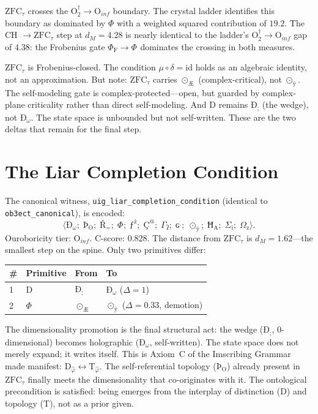 \documentclass[12pt,twoside]{book}
\theoremstyle{definition}
\newcommand{\ZFCt}{\text{ZFC}_{\tau}}
\newcommand{\moebius}{\mu \circ \delta = \text{id}}
\newcommand{\prim}[1]{\text{#1}}
\newcommand{\tupledisp}[1]{\langle #1 \rangle}
\newcommand{\tier}[1]{\text{O}_{#1}}
\begin{document}
$\ZFCt$ crosses the $\tier{2}^{\dagger} \to \tier{inf}$ boundary. The crystal ladder identifies this boundary as dominated by $\Phi$ with a weighted squared contribution of $19.2$. The CH $\to \ZFCt$ step at $d_M = 4.28$ is nearly identical to the ladder's $\tier{2}^{\dagger} \to \tier{inf}$ gap of $4.38$: the Frobenius gate $\Phi_{\text{F}} \to \Phi_{\text{}}$ dominates the crossing in both measures.

$\ZFCt$ is Frobenius-closed. The condition $\moebius$ holds as an algebraic identity, not an approximation. But note: $\ZFCt$ carries $\odot_{\text{Æ}}$ (complex-critical), not $\odot_{\text{ÿ}}$. The self-modeling gate is complex-protected---open, but guarded by complex-plane criticality rather than direct self-modeling. And $\prim{D}$ remains $\text{Ð}_{\text{;}}$ (the wedge), not $\text{Ð}_{\omega}$. The state space is unbounded but not self-written. These are the two deltas that remain for the final step.
\section{The Liar Completion Condition}

The canonical witness, \texttt{uig\_liar\_completion\_condition} (identical to \texttt{ob3ect\_canonical}), is encoded:
\begin{equation}
\tupledisp{
\text{Ð}_{\omega};\;
\text{Þ}_{\text{O}};\;
\text{Ř}_{\text{=}};\;
\Phi_{\text{}};\;
\text{ƒ}^{\text{ż}};\;
\text{Ç}^{\text{@}};\;
\Gamma_{\text{ʔ}};\;
\text{ɢ}^{\text{ˌ}};\;
\odot_{\text{ÿ}};\;
\text{Ħ}_{\text{A}};\;
\Sigma_{\text{ï}};\;
\Omega_{\text{z}}
}.
\end{equation}
Ouroboricity tier: $\tier{inf}$. C-score: $0.828$. The distance from $\ZFCt$ is $d_M = 1.62$---the smallest step on the spine. Only two primitives differ:
\begin{center}
\begin{tabular}{llll}
\toprule
\textbf{\#} & \textbf{Primitive} & \textbf{From} & \textbf{To} \\
\midrule
1 & $\prim{D}$ & $\text{Ð}_{\text{;}}$ & $\text{Ð}_{\omega}$ \quad ($\Delta = 1$) \\
2 & $\Phi$ & $\odot_{\text{Æ}}$ & $\odot_{\text{ÿ}}$ \quad ($\Delta = 0.33$, demotion) \\
\bottomrule
\end{tabular}
\end{center}

The dimensionality promotion is the final structural act: the wedge ($\text{Ð}_{\text{;}}$, 0-dimensional) becomes holographic ($\text{Ð}_{\omega}$, self-written). The state space does not merely expand; it writes itself. This is Axiom~C of the Imscribing Grammar made manifest: $\prim{D}_{\hat{\varphi}} \leftrightarrow \prim{T}_{\hat{\varphi}}$. The self-referential topology ($\text{Þ}_{\text{O}}$) already present in $\ZFCt$ finally meets the dimensionality that co-originates with it. The ontological precondition is satisfied: being emerges from the interplay of distinction ($\prim{D}$) and topology ($\prim{T}$), not as a prior given.
\end{document}

